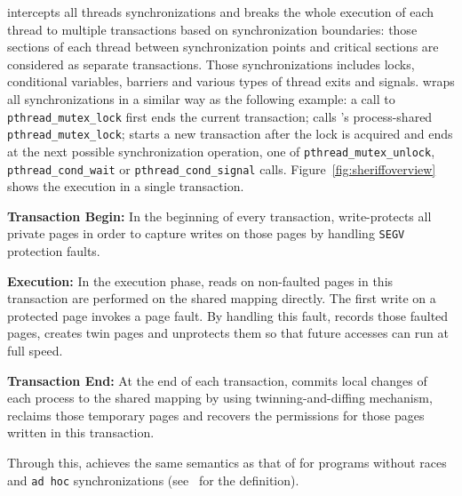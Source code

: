 \sheriff{} intercepts all threads synchronizations and breaks the whole execution of each thread to 
multiple transactions based on synchronization boundaries: 
those sections of each thread between synchronization points and critical sections
are considered as separate transactions.
Those synchronizations includes locks, conditional variables, barriers and 
various types of thread exits and signals.
\sheriff{} wraps all synchronizations in a similar way as the following example:
a call to \texttt{pthread\_mutex\_lock} first ends the current transaction; 
\sheriff{} calls \pthreads{}'s process-shared \texttt{pthread\_mutex\_lock};  
\sheriff{} starts a new transaction after the lock is acquired and ends at the next 
possible synchronization operation, one of \texttt{pthread\_mutex\_unlock}, 
\texttt{pthread\_cond\_wait} or \texttt{pthread\_cond\_signal} calls.
Figure~\ref{fig:sheriffoverview} shows the execution in a single transaction. 

\textbf{Transaction Begin:}
In the beginning of every transaction, \sheriff{} write-protects all private pages in order to
capture writes on those pages by handling \texttt{SEGV} protection faults.  

\textbf{Execution:} In the execution phase, reads on non-faulted pages in this transaction 
are performed on the shared mapping directly. The first write on
a protected page invokes a page fault. By handling this fault,  
\sheriff{} records those faulted pages, creates twin pages 
and unprotects them so that future accesses can run at full speed.  

\textbf{Transaction End:} At the end of each transaction, \sheriff{} 
commits local changes of each process to the shared mapping by using twinning-and-diffing mechanism, 
reclaims those temporary pages and
recovers the permissions for those pages written in this transaction. 
   
Through this, \sheriff{} achieves the same semantics as 
that of \pthreads{} for programs without races
and \texttt{ad hoc} synchronizations (see~\cite{ad-hoc-considered-harmful} for the definition).


